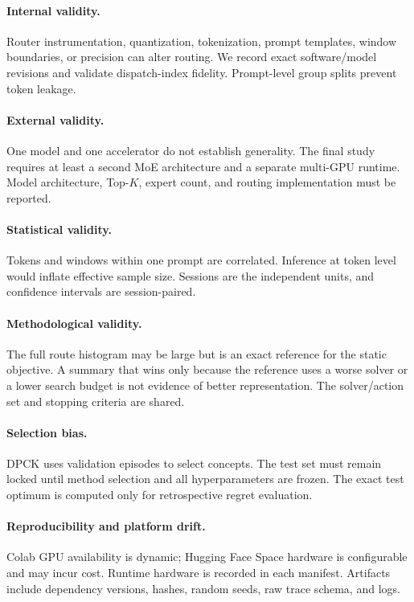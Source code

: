 \documentclass[a4paper,preprint,review,12pt,authoryear]{elsarticle}
\begin{document}
\paragraph{Internal validity.} Router instrumentation, quantization, tokenization, prompt templates, window boundaries, or precision can alter routing. We record exact software/model revisions and validate dispatch-index fidelity. Prompt-level group splits prevent token leakage.

\paragraph{External validity.} One model and one accelerator do not establish generality. The final study requires at least a second MoE architecture and a separate multi-GPU runtime. Model architecture, Top-$K$, expert count, and routing implementation must be reported.

\paragraph{Statistical validity.} Tokens and windows within one prompt are correlated. Inference at token level would inflate effective sample size. Sessions are the independent units, and confidence intervals are session-paired.

\paragraph{Methodological validity.} The full route histogram may be large but is an exact reference for the static objective. A summary that wins only because the reference uses a worse solver or a lower search budget is not evidence of better representation. The solver/action set and stopping criteria are shared.

\paragraph{Selection bias.} DPCK uses validation episodes to select concepts. The test set must remain locked until method selection and all hyperparameters are frozen. The exact test optimum is computed only for retrospective regret evaluation.

\paragraph{Reproducibility and platform drift.} Colab GPU availability is dynamic; Hugging Face Space hardware is configurable and may incur cost. Runtime hardware is recorded in each manifest. Artifacts include dependency versions, hashes, random seeds, raw trace schema, and logs.
\end{document}
